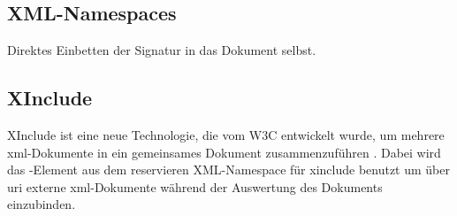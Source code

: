 

\subsection{XML-Namespaces}
Direktes Einbetten der Signatur in das Dokument selbst.



\subsection{XInclude}
XInclude ist eine neue Technologie, die vom W3C entwickelt wurde, um mehrere \gls{xml}-Dokumente in ein gemeinsames Dokument zusammenzuführen \cite{xml:oreilly}.
Dabei wird das -Element aus dem reservieren XML-Namespace für \gls{xinclude} benutzt um über \gls{uri} externe \gls{xml}-Dokumente während der
Auswertung des Dokuments einzubinden.


